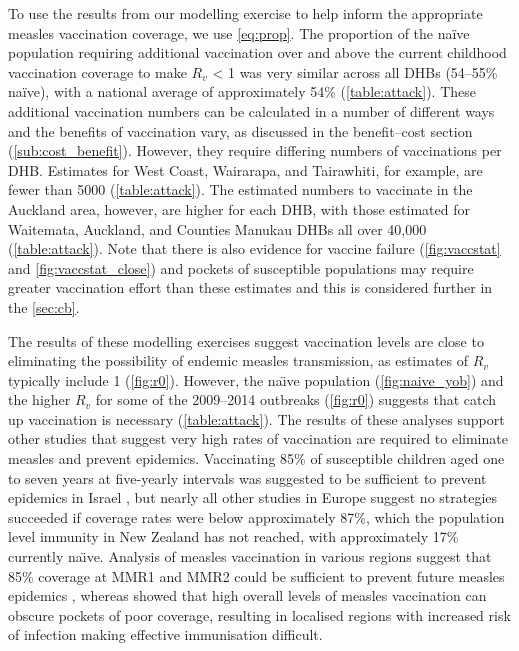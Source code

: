 \documentclass{article}
\begin{document}
To use the results from our modelling exercise to help inform the appropriate measles vaccination coverage, we use \autoref{eq:prop}. The proportion of the na\"{i}ve population requiring additional vaccination over and above the current childhood vaccination coverage to make $R_v$ < 1 was very similar across all DHBs (54--55\% na\"{i}ve), with a national average of approximately 54\% (\autoref{table:attack}). These additional vaccination numbers can be calculated in a number of different ways and the benefits of vaccination vary, as discussed in the benefit--cost section (\autoref{sub:cost_benefit}). However, they require differing numbers of vaccinations per DHB. Estimates for West Coast, Wairarapa, and Tairawhiti, for example, are fewer than 5000 (\autoref{table:attack}). The estimated numbers to vaccinate in the Auckland area, however, are higher for each DHB, with those estimated for Waitemata, Auckland, and Counties Manukau DHBs all over 40,000  (\autoref{table:attack}). Note that there is also evidence for vaccine failure (\autoref{fig:vaccstat} and \autoref{fig:vaccstat_close}) and pockets of susceptible populations \citep{glass4} may require greater vaccination effort than these estimates and this is considered further in the \autoref{sec:cb}.

The results of these modelling exercises suggest vaccination levels are close to eliminating the possibility of endemic measles transmission, as estimates of $R_v$ typically include 1 (\autoref{fig:r0}). However, the na\"{\i}ve population (\autoref{fig:naive_yob}) and the higher $R_v$ for some of the 2009--2014 outbreaks (\autoref{fig:r0}) suggests that catch up vaccination is necessary (\autoref{table:attack}). The results of these analyses support other studies that suggest very high rates of vaccination are required to eliminate measles and prevent epidemics. Vaccinating 85\% of susceptible children aged one to seven years at five-yearly intervals was suggested to be sufficient to prevent epidemics in Israel \citep{agur93}, but nearly all other studies in Europe suggest no strategies succeeded if coverage rates were below approximately 87\%, which the population level immunity in New Zealand has not reached, with approximately 17\% currently na\"{\i}ve. Analysis of measles vaccination in various regions suggest that 85\% coverage at MMR1 and MMR2 could be sufficient to prevent future measles epidemics \citep{agur93, babad95, edmunds0, gay98, wallinga1}, whereas \citep{glass4} showed that high overall levels of measles vaccination can obscure pockets of poor coverage, resulting in localised regions with increased risk of infection making effective immunisation difficult.
\end{document}
